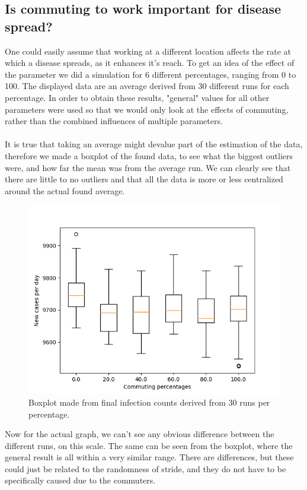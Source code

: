 \documentclass[runningheads]{llncs}
\begin{document}
	\subsection{Is commuting to work important for disease spread?}
	One could easily assume that working at a different location affects the rate at which a disease spreads, as it enhances it's reach. To get an idea of the effect of the parameter we did a simulation for 6 different percentages, ranging from 0 to 100. The displayed data are an average derived from 30 different runs for each percentage. In order to obtain these results, "general" values for all other parameters were used so that we would only look at the effects of commuting, rather than the combined influences of multiple parameters. \\
	\\
	\noindent 
	It is true that taking an average might devalue part of the estimation of the data, therefore we made a boxplot of the found data, to see what the biggest outliers were, and how far the mean was from the average run. We can clearly see that there are little to no outliers and that all the data is more or less centralized around the actual found average.
	\begin{figure}
		\includegraphics[width=\textwidth]{commuting_boxplot.png}
		\caption{Boxplot made from final infection counts derived from 30 runs per percentage.}
	\end{figure}
	
	\noindent
	Now for the actual graph, we can't see any obvious difference between the different runs, on this scale. The same can be seen from the boxplot, where the general result is all within a very similar range. There are differences, but these could just be related to the randomness of stride, and they do not have to be specifically caused due to the commuters. 
	
\end{document}

